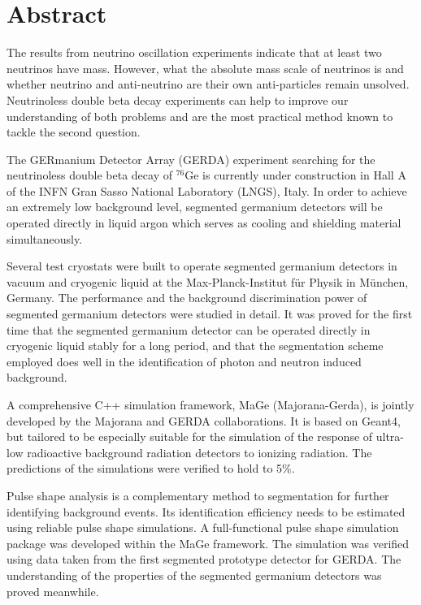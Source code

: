 \section*{Abstract}
The results from neutrino oscillation experiments indicate that at least two neutrinos have mass. However, what the absolute mass scale of neutrinos is and whether neutrino and anti-neutrino are their own anti-particles remain unsolved. Neutrinoless double beta decay experiments can help to improve our understanding of both problems and are the most practical method known to tackle the second question. 

The GERmanium Detector Array (GERDA) experiment searching for the neutrinoless double beta decay of $^{76}$Ge is currently under construction in Hall A of the INFN Gran Sasso National Laboratory (LNGS), Italy. In order to achieve an extremely low background level, segmented germanium detectors will be operated directly in liquid argon which serves as cooling and shielding material simultaneously. 

Several test cryostats were built to operate segmented germanium detectors in vacuum and cryogenic liquid at the Max-Planck-Institut f\"ur Physik in M\"unchen, Germany. The performance and the background discrimination power of segmented germanium detectors were studied in detail. It was proved for the first time that the segmented germanium detector can be operated directly in cryogenic liquid stably for a long period, and that the segmentation scheme employed does well in the identification of photon and neutron induced background.

A comprehensive C++ simulation framework, MaGe (Majorana-Gerda), is jointly developed by the Majorana and GERDA collaborations. It is based on Geant4, but tailored to be especially suitable for the simulation of the response of ultra-low radioactive background radiation detectors to ionizing radiation. The predictions of the simulations were verified to hold to 5\%.

Pulse shape analysis is a complementary method to segmentation for further identifying background events. Its identification efficiency needs to be estimated using reliable pulse shape simulations. A full-functional pulse shape simulation package was developed within the MaGe framework. The simulation was verified using data taken from the first segmented prototype detector for GERDA. The understanding of the properties of the segmented germanium detectors was proved meanwhile.

\clearpage


